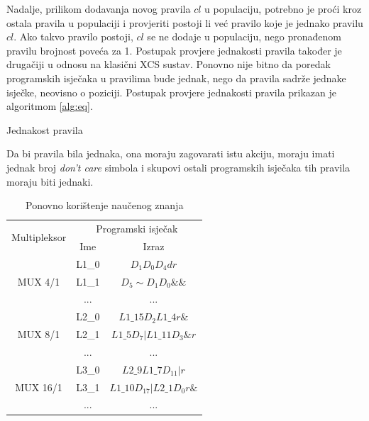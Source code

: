 \documentclass[times, utf8, zavrsni]{fer}
\begin{document}
Nadalje, prilikom dodavanja novog pravila $cl$ u populaciju, potrebno je proći kroz ostala pravila u populaciji i provjeriti postoji li već pravilo koje je jednako pravilu $cl$.
Ako takvo pravilo postoji, $cl$ se ne dodaje u populaciju, nego pronađenom pravilu brojnost poveća za 1.
Postupak provjere jednakosti pravila također je drugačiji u odnosu na klasični XCS sustav.
Ponovno nije bitno da poredak programskih isječaka u pravilima bude jednak, nego da pravila sadrže jednake isječke, neovisno o poziciji.
Postupak provjere jednakosti pravila prikazan je algoritmom \ref{alg:eq}.
\begin{algorithm}
\caption{Jednakost pravila}
\label{alg:eq}
\begin{algorithmic}
\ENDIF
{}
\ENDIF
{}
\ENDIF
{}
\end{algorithmic}
\end{algorithm}
Da bi pravila bila jednaka, ona moraju zagovarati istu akciju, moraju imati jednak broj \emph{don't care} simbola i skupovi ostali programskih isječaka tih pravila moraju biti jednaki.

\begin{table}[htb]
\caption{Ponovno korištenje naučenog znanja}
\label{tbl:reuse}
\centering
\begin{tabular}{c | c | c}
\multirow{2}{*}{Multipleksor} & \multicolumn{2}{c}{Programski isječak} \\
& Ime & Izraz \\ \hline
\multirow{3}{*}{MUX 4/1} & L1\_0 & $D_{1}D_{0}D_{4}dr$ \\
& L1\_1 & $D_{5}\sim D_{1}D_{0}\&\&$ \\
& ... & ... \\ \hline
\multirow{3}{*}{MUX 8/1} & L2\_0 & $L1\_15D_{2}L1\_4r\&$ \\
& L2\_1 & $L1\_5D_{7}|L1\_11D_{3}\&r$ \\
& ... & ... \\ \hline
\multirow{3}{*}{MUX 16/1} & L3\_0 & $L2\_9L1\_7D_{11}|r$ \\
& L3\_1 & $L1\_10D_{17}|L2\_1D_{0}r\&$ \\
& ... & ... \\
\end{tabular}
\end{table}
\end{document}

